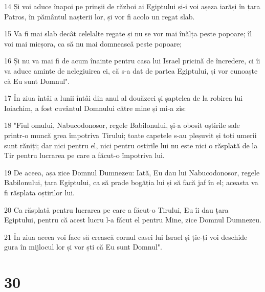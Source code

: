 \par 14 Și voi aduce înapoi pe prinșii de război ai Egiptului și-i voi așeza iarăși în țara Patros, în pământul nașterii lor, și vor fi acolo un regat slab.
\par 15 Va fi mai slab decât celelalte regate și nu se vor mai înălța peste popoare; îl voi mai micșora, ca să nu mai domnească peste popoare;
\par 16 Și nu va mai fi de acum înainte pentru casa lui Israel pricină de încredere, ci îi va aduce aminte de nelegiuirea ei, că s-a dat de partea Egiptului, și vor cunoaște că Eu sunt Domnul".
\par 17 În ziua întâi a lunii întâi din anul al douăzeci și șaptelea de la robirea lui Ioiachim, a fost cuvântul Domnului către mine și mi-a zis:
\par 18 "Fiul omului, Nabucodonosor, regele Babilonului, și-a obosit oștirile sale printr-o muncă grea împotriva Tirului; toate capetele s-au pleșuvit și toți umerii sunt răniți; dar nici pentru el, nici pentru oștirile lui nu este nici o răsplată de la Tir pentru lucrarea pe care a făcut-o împotriva lui.
\par 19 De aceea, așa zice Domnul Dumnezeu: Iată, Eu dau lui Nabucodonosor, regele Babilonului, țara Egiptului, ca să prade bogăția lui și să facă jaf în el; aceasta va fi răsplata oștirilor lui.
\par 20 Ca răsplată pentru lucrarea pe care a făcut-o Tirului, Eu îi dau țara Egiptului, pentru că acest lucru l-a făcut el pentru Mine, zice Domnul Dumnezeu.
\par 21 În ziua aceea voi face să crească cornul casei lui Israel și ție-ți voi deschide gura în mijlocul lor și vor ști că Eu sunt Domnul".

\chapter{30}

